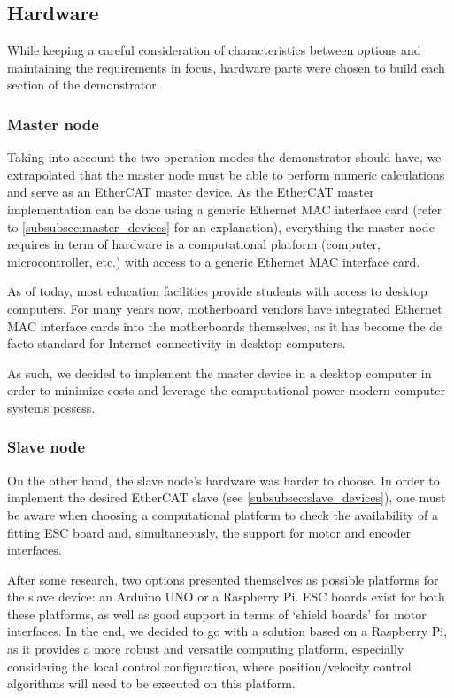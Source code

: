 \subsection{Hardware} \label{sec:proposed-hardware}

While keeping a careful consideration of characteristics between options and maintaining the requirements in focus, hardware parts were chosen to build each section of the demonstrator.

\subsubsection{Master node}

Taking into account the two operation modes the demonstrator should have, we extrapolated that the master node must be able to perform numeric calculations and serve as an EtherCAT master device.
As the EtherCAT master implementation can be done using a generic Ethernet MAC interface card (refer to \ref{subsubsec:master_devices} for an explanation), everything the master node requires in term of hardware is a computational platform (computer, microcontroller, etc.) with access to a generic Ethernet MAC interface card.

As of today, most education facilities provide students with access to desktop computers.
For many years now, motherboard vendors have integrated Ethernet MAC interface cards into the motherboards themselves, as it has become the de facto standard for Internet connectivity in desktop computers.

As such, we decided to implement the master device in a desktop computer in order to minimize costs and leverage the computational power modern computer systems possess.

\subsubsection{Slave node} \label{subsubsec:slave_hdw}

On the other hand, the slave node's hardware was harder to choose.
In order to implement the desired EtherCAT slave (see \ref{subsubsec:slave_devices}), one must be aware when choosing a computational platform to check the availability of a fitting ESC board and, simultaneously, the support for motor and encoder interfaces.

After some research, two options presented themselves as possible platforms for the slave device: an Arduino UNO or a Raspberry Pi.
ESC boards exist for both these platforms, as well as good support in terms of `shield boards' for motor interfaces.
In the end, we decided to go with a solution based on a Raspberry Pi, as it provides a more robust and versatile computing platform, especially considering the local control configuration, where position/velocity control algorithms will need to be executed on this platform.

